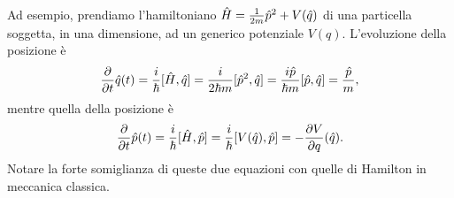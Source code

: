 Ad esempio, prendiamo l'hamiltoniano $\hat{H}=\frac1{2m}\hat{p}^2+V(\hat{q})$ di una particella soggetta, in una dimensione, ad un generico potenziale $V(q)$.
L'evoluzione della posizione è
\begin{equation}
	\frac{\partial {}}{\partial {t}}\hat{q}(t)=\frac{i}{\hbar}[\hat{H},\hat{q}]=\frac{i}{2\hbar m}[\hat{p}^2,\hat{q}]=\frac{i\hat{p}}{\hbar m}[\hat{p},\hat{q}]=\frac{\hat{p}}{m},
\end{equation}
mentre quella della posizione è
\begin{equation}
	\frac{\partial {}}{\partial {t}}\hat{p}(t)=\frac{i}{\hbar}[\hat{H},\hat{p}]=\frac{i}{\hbar}[V(\hat{q}),\hat{p}]=-\frac{\partial {V}}{\partial {q}}(\hat{q}).
\end{equation}
Notare la forte somiglianza di queste due equazioni con quelle di Hamilton in meccanica classica.
